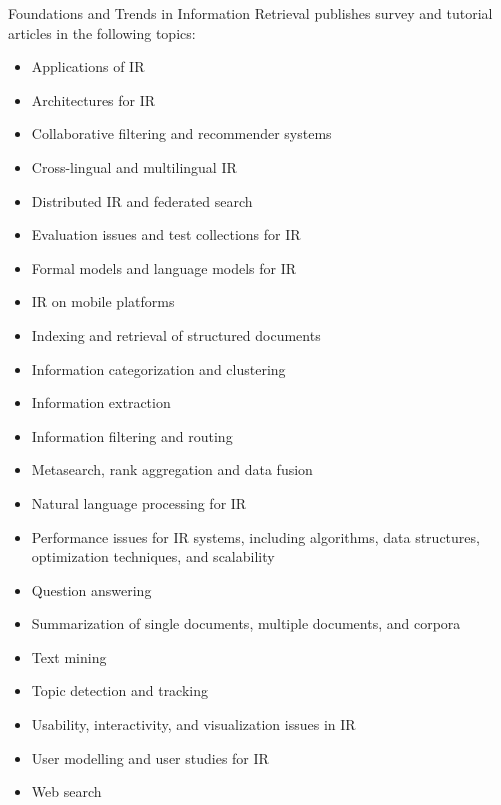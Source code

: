 


\journalaimsandscope
 {%
  Foundations and Trends\textsuperscript{\textregistered} in
Information Retrieval publishes
 survey and tutorial articles in the following topics:
 \begin{multicols}{2}\raggedcolumns
 \begin{itemize}
\item{Applications of IR}
\item{Architectures for IR}
\item{Collaborative filtering and recommender systems}
\item{Cross-lingual and multilingual IR}
\item{Distributed IR and federated search}
\item{Evaluation issues and test collections for IR}
\item{Formal models and language models for IR}
\item{IR on mobile platforms}
\item{Indexing and retrieval of structured documents}
\item{Information categorization and clustering}
\item{Information extraction}
\item{Information filtering and routing}
\item{Metasearch, rank aggregation and data fusion}
\item{Natural language processing for IR}
\item{Performance issues for IR systems, including algorithms, data structures, optimization techniques, and scalability}
\item{Question answering}
\item{Summarization of single documents, multiple documents, and corpora}
\item{Text mining}
\item{Topic detection and tracking}
\item{Usability, interactivity, and visualization issues in IR}
\item{User modelling and user studies for IR}
\item{Web search}
\end{itemize}
\end{multicols}
 }


